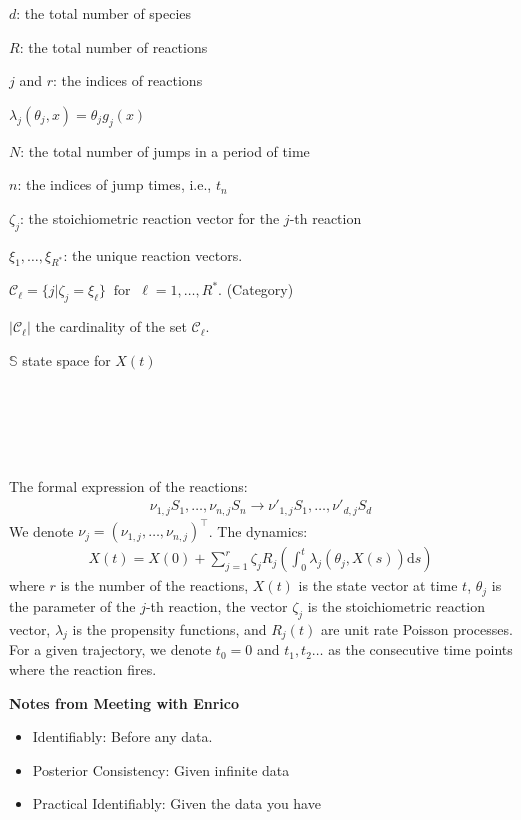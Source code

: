 \documentclass[pdflatex,sn-mathphys-num]{sn-jnl}%
\def\dd{\text{d}}
\theoremstyle{thmstyleone}%
\theoremstyle{thmstyletwo}%
\theoremstyle{thmstylethree}%
\begin{document}
$d$: the total number of species

$R$: the total number of reactions

$j$ and $r$: the indices of reactions

$\lambda_j (\theta_j, x) = \theta_j g_j(x)$

$N$: the total number of jumps in a period of time 

$n$: the indices of jump times, i.e., $t_n$

$\zeta_j$: the stoichiometric reaction vector for the $j$-th reaction

$\xi_1, \dots, \xi_{R^*}$: the unique reaction vectors.

$\mathcal C_\ell = \{ j| \zeta_j = \xi_\ell \}
\ \text{ for } \ 
\ell=1,\dots,R^*.$ (Category)

$\left| \mathcal C_\ell \right| $ the cardinality of the set $\mathcal C_\ell$.

$\mathbb S$ state space for $X(t)$
 
 


~\\~\\~\\~

The formal expression of the reactions:
\begin{align*}
    \nu_{1,j} S_1, \dots, \nu_{n, j}S_n
    \to \nu'_{1,j} S_1, \dots, \nu'_{d, j}S_d
\end{align*}
We denote $\nu_j = \left(\nu_{1, j},\dots, \nu_{n,j}\right)^{\top}$.
The dynamics:
\begin{align*}
    X(t) = X(0) + \sum_{j=1}^{r} \zeta_j R_j\left( \int_{0}^t\lambda_j(\theta_j,X(s)) \dd s\right)
\end{align*}
where $r$ is the number of the reactions, $X(t)$ is the state vector at time $t$, $\theta_j$ is the parameter of the $j$-th reaction, the vector $\zeta_{j}$ is the stoichiometric reaction vector, $\lambda_j$ is the propensity functions, and $R_j(t)$ are unit rate Poisson processes.
For a given trajectory, we denote $t_0=0$ and $t_1, t_2 \dots$ as the consecutive time points where the reaction fires.  

\textbf{Notes from Meeting with Enrico}
\begin{itemize}
    \item Identifiably: Before any data.
\item Posterior Consistency: Given infinite data
\item Practical Identifiably: Given the data you have
\end{itemize}
\end{document}
